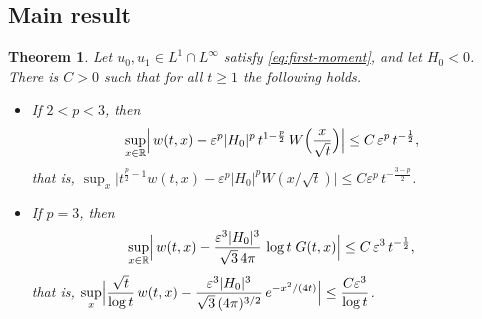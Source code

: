 \documentclass[11pt]{amsart}
\newtheorem{theorem}{Theorem}[section]
\theoremstyle{definition}
\theoremstyle{remark}
\numberwithin{equation}{section}
\newcommand{\R}{{\mathbb R}}
\newcommand{\ep}{\varepsilon}
\begin{document}
\subsection{Main result}
\begin{theorem}\label{thm:w-asympt}
Let $u_0,u_1\in L^1\cap L^\infty$ satisfy \eqref{eq:first-moment}, and let
$H_0<0$. There is $C>0$ such that for all $t\ge1$ the following holds.
\begin{itemize}
\item If $2<p<3$, then
\begin{equation}\label{eq:w-asympt-p<3}
\sup_{x\in\R}\Bigl|\,w(t,x)-\ep^p|H_0|^p\,t^{1-\frac p2}\,
W\Big(\frac{x}{\sqrt t}\Big)\Bigr|\le C\,\ep^p\,t^{-\frac12},
\end{equation}
that is,
$\displaystyle\sup_{x}\bigl|t^{\frac p2-1}w(t,x)-\ep^p|H_0|^pW(x/\sqrt t)\bigr|
\le C\ep^p\,t^{-\frac{3-p}{2}}$.
\item If $p=3$, then
\begin{equation}\label{eq:w-asympt-p=3}
\sup_{x\in\R}\Bigl|\,w(t,x)-\frac{\ep^3|H_0|^3}{\sqrt3\,4\pi}\,\log t\;G(t,x)\Bigr|
\le C\,\ep^3\,t^{-\frac12},
\end{equation}
that is,
$\displaystyle\sup_{x}\Bigl|\frac{\sqrt t}{\log t}\,w(t,x)
-\frac{\ep^3|H_0|^3}{\sqrt3\,(4\pi)^{3/2}}\,e^{-x^2/(4t)}\Bigr|\le \frac{C\ep^3}{\log t}$.
\end{itemize}
\end{theorem}
\end{document}
